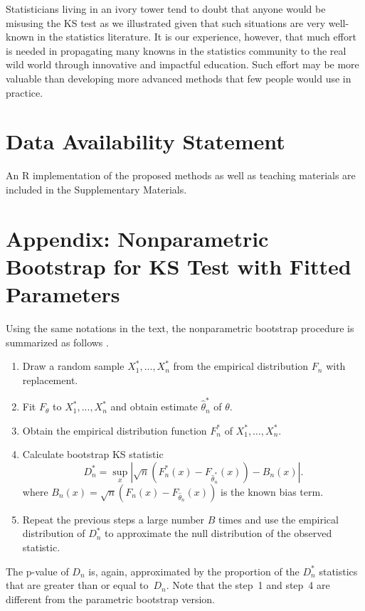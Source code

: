 \documentclass[12pt, letterpaper]{article}
\begin{document}
Statisticians living in
an ivory tower tend to doubt that anyone would be misusing the KS test as we
illustrated given that such situations are very well-known in the statistics
literature. It is our experience, however, that much effort is needed in
propagating many knowns in the statistics community to the real wild world
through innovative and impactful education. Such effort may be more valuable
than developing more advanced methods that few people would use in practice.


\section*{Data Availability Statement}
An R implementation of the proposed methods as well as teaching materials are  
included in the Supplementary Materials.  

\appendix

\section{Appendix: Nonparametric Bootstrap for KS Test with Fitted Parameters}

Using the same notations in the text, the nonparametric bootstrap procedure 
is summarized as follows \citep{babu2004goodness}.
\begin{enumerate}
\item
  Draw a random sample $X_1^*,...,X_n^*$ from the empirical distribution $F_n$
  with replacement.
\item
  Fit $F_\theta$ to $X_1^*,...,X_n^*$ and obtain estimate 
	$\hat\theta_n^*$ of $\theta$.
\item
  Obtain the empirical distribution function $F_n^*$ of
  $X_1^*, \ldots,  X_n^*$. 
\item
  Calculate bootstrap KS statistic
  \[
    D_n^* = \sup_x | \sqrt{n}\left(F_n^* (x)- F_{\hat\theta_n^*}(x)\right) - B_n(x) |.
  \]
  where $B_{n}(x) = \sqrt{n}(F_{n}(x) - F_{\hat\theta_n}(x))$ is the known
  bias term.
\item
  Repeat the previous steps a large number $B$ times and use the empirical
  distribution of $D_n^*$ to approximate the null distribution of the observed
  statistic. 
\end{enumerate}
The p-value of $D_n$ is, again, approximated by the proportion of the $D_n^*$
statistics that are greater than or equal to~$D_n$. Note that the step~1 and
step~4 are different from the parametric bootstrap version.



\end{document}
